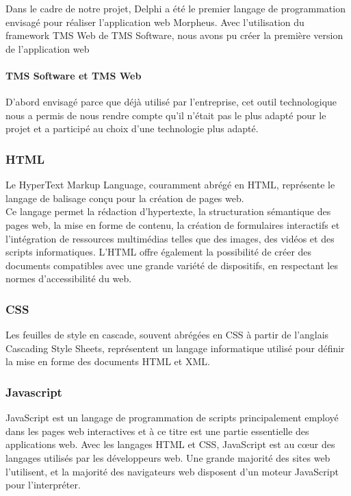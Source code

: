 \documentclass[a4paper, 12pt, french]{article}
\begin{document}
					Dans le cadre de notre projet, Delphi a été le premier langage de programmation envisagé pour réaliser l'application web Morpheus. Avec l'utilisation du framework TMS Web de TMS Software, nous avons pu créer la première version de l'application web

					\paragraph{TMS Software et TMS Web\\}
						
		
					D'abord envisagé parce que déjà utilisé par l'entreprise, cet outil technologique nous a permis de nous rendre compte qu'il n'était pas le plus adapté pour le projet et a participé au choix d'une technologie plus adapté.

				\subsubsection{HTML}%
					Le HyperText Markup Language, couramment abrégé en HTML, représente le langage de balisage conçu pour la création de pages web.\\

					Ce langage permet la rédaction d'hypertexte, la structuration sémantique des pages web, la mise en forme de contenu, la création de formulaires interactifs et l'intégration de ressources multimédias telles que des images, des vidéos et des scripts informatiques. L'HTML offre également la possibilité de créer des documents compatibles avec une grande variété de dispositifs, en respectant les normes d'accessibilité du web.				
				
				\subsubsection{CSS}%
					Les feuilles de style en cascade, souvent abrégées en CSS à partir de l'anglais Cascading Style Sheets, représentent un langage informatique utilisé pour définir la mise en forme des documents HTML et XML.
					
				\subsubsection{Javascript}%
					JavaScript est un langage de programmation de scripts principalement employé dans les pages web interactives et à ce titre est une partie essentielle des applications web. Avec les langages HTML et CSS, JavaScript est au cœur des langages utilisés par les développeurs web. Une grande majorité des sites web l'utilisent, et la majorité des navigateurs web disposent d'un moteur JavaScript pour l'interpréter.
\end{document}
